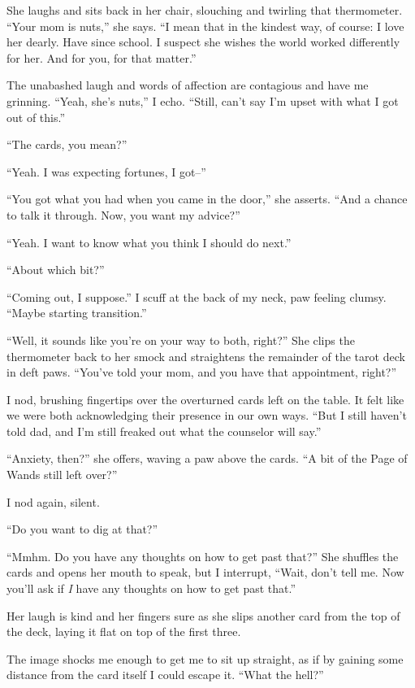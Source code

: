 She laughs and sits back in her chair, slouching and twirling that
thermometer. ``Your mom is nuts,'' she says. ``I mean that in the
kindest way, of course: I love her dearly. Have since school. I suspect
she wishes the world worked differently for her. And for you, for that
matter.''

The unabashed laugh and words of affection are contagious and have me
grinning. ``Yeah, she's nuts,'' I echo. ``Still, can't say I'm upset
with what I got out of this.''

``The cards, you mean?''

``Yeah. I was expecting fortunes, I got--''

``You got what you had when you came in the door,'' she asserts. ``And a
chance to talk it through. Now, you want my advice?''

``Yeah. I want to know what you think I should do next.''

``About which bit?''

``Coming out, I suppose.'' I scuff at the back of my neck, paw feeling
clumsy. ``Maybe starting transition.''

``Well, it sounds like you're on your way to both, right?'' She clips
the thermometer back to her smock and straightens the remainder of the
tarot deck in deft paws. ``You've told your mom, and you have that
appointment, right?''

I nod, brushing fingertips over the overturned cards left on the table.
It felt like we were both acknowledging their presence in our own ways.
``But I still haven't told dad, and I'm still freaked out what the
counselor will say.''

``Anxiety, then?'' she offers, waving a paw above the cards. ``A bit of
the Page of Wands still left over?''

I nod again, silent.

``Do you want to dig at that?''

``Mmhm. Do you have any thoughts on how to get past that?'' She shuffles
the cards and opens her mouth to speak, but I interrupt, ``Wait, don't
tell me. Now you'll ask if \emph{I} have any thoughts on how to get past
that.''

Her laugh is kind and her fingers sure as she slips another card from
the top of the deck, laying it flat on top of the first three.

The image shocks me enough to get me to sit up straight, as if by
gaining some distance from the card itself I could escape it. ``What the
hell?''

